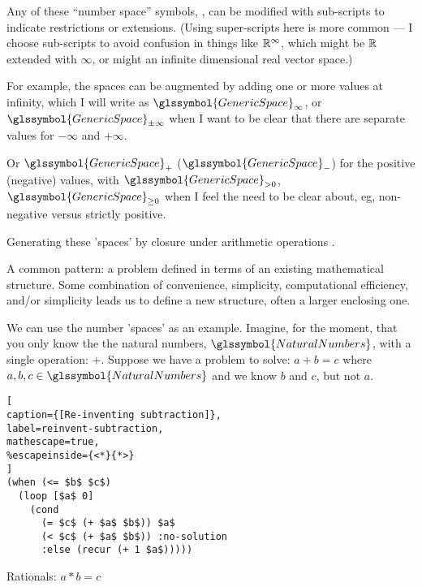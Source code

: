 Any of these ``number space'' symbols, ,
can be modified with sub-scripts to indicate restrictions or
extensions. 
(Using super-scripts here is more common --- I choose sub-scripts
to avoid confusion in things like $\mathbb{R}^{\infty}$,
which might be $\mathbb{R}$ extended with ${\infty}$, 
or might an infinite dimensional real vector space.)

For example, the spaces can be 
augmented by adding one or more values at infinity, which I will
write as $\glssymbol{GenericSpace}_{\infty}$,
or $\glssymbol{GenericSpace}_{\pm\infty}$ when I want to be 
clear that there are separate values for $-\infty$ and $+\infty$.

Or $\glssymbol{GenericSpace}_{+}$ ($\glssymbol{GenericSpace}_{-}$)
for the positive (negative) values, with 
$\glssymbol{GenericSpace}_{> 0}$, $\glssymbol{GenericSpace}_{\geq 0}$ 
when I feel the need to be clear about, eg, non-negative versus
strictly positive.


Generating these 'spaces' by closure under arithmetic operations
\cite{PickertGorke:1974:RealNumbers}.

A common pattern: a problem defined in terms of an existing mathematical
structure. Some combination of convenience, simplicity, computational
efficiency, and/or simplicity leads us to define a new structure, 
often a larger enclosing one.

We can use the number 'spaces' as an example.
Imagine, for the moment, that you only know the 
the natural numbers, $\glssymbol{NaturalNumbers}$, with a single operation: $+$.
Suppose we have a problem to solve:
\begin{math}
a + b = c
\end{math}
where $a,b,c\in \glssymbol{NaturalNumbers}$ and we know $b$ and $c$,
but not $a$.

\begin{minipage}{\linewidth}
\begin{lstlisting}[
caption={[Re-inventing subtraction]},
label=reinvent-subtraction,
mathescape=true,
%escapeinside={<*}{*>}
] 
(when (<= $b$ $c$)
  (loop [$a$ 0]
    (cond 
      (= $c$ (+ $a$ $b$)) $a$
      (< $c$ (+ $a$ $b$)) :no-solution
      :else (recur (+ 1 $a$)))))
\end{lstlisting}
\end{minipage}

Rationals: 
\begin{math}
a * b = c
\end{math}


